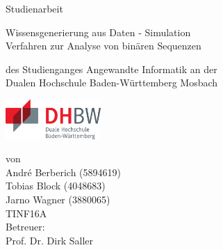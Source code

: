 \def\doctype{Studienarbeit}
\def\title{
Wissensgenerierung aus Daten - Simulation \\
Verfahren zur Analyse von binären Sequenzen
}

\begin{titlepage}

\vspace{10mm}

\begin{center}
	\vspace{5mm}
	
	\huge \doctype
	
	\vspace{14.2pt}
	
	\huge \title
	
	
	
	
	\vspace{32.6pt}
	
	\small des Studienganges Angewandte Informatik an der \\
	\large Dualen Hochschule Baden-Württemberg Mosbach
    
    \vspace{14.2pt}

    \includegraphics[height=1.5cm]{prefix/image/logo-dhbw.eps}

	\vspace{42.6pt}
	
	\small von \\
	\large André Berberich (5894619) \\
	\large Tobias Block (4048683) \\
	\large Jarno Wagner (3880065) \\
	TINF16A \\
	
	
	 \vspace{14.2pt}
	\small Betreuer: \\
	\normalsize Prof. Dr. Dirk Saller
	
\end{center}

\vspace{42.6pt}



\vspace{49.7pt}


\end{titlepage}